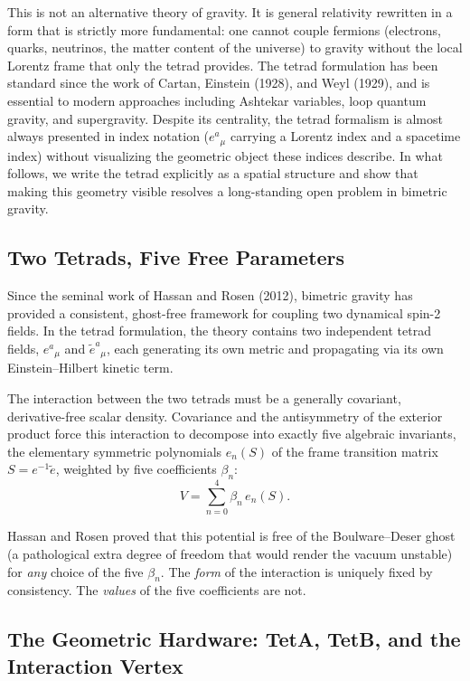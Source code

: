 \documentclass[twocolumn]{iopjournal}
\begin{document}
This is not an alternative theory of gravity. It is general relativity rewritten in a form that is strictly more fundamental: one cannot couple fermions (electrons, quarks, neutrinos, the matter content of the universe) to gravity without the local Lorentz frame that only the tetrad provides. The tetrad formulation has been standard since the work of Cartan, Einstein (1928), and Weyl (1929), and is essential to modern approaches including Ashtekar variables, loop quantum gravity, and supergravity. Despite its centrality, the tetrad formalism is almost always presented in index notation ($e^a{}_\mu$ carrying a Lorentz index and a spacetime index) without visualizing the geometric object these indices describe. In what follows, we write the tetrad explicitly as a spatial structure and show that making this geometry visible resolves a long-standing open problem in bimetric gravity.

\subsection*{Two Tetrads, Five Free Parameters}

Since the seminal work of Hassan and Rosen (2012), bimetric gravity has provided a consistent, ghost-free framework for coupling two dynamical spin-2 fields. In the tetrad formulation, the theory contains two independent tetrad fields, $e^a{}_\mu$ and $\tilde{e}^a{}_\mu$, each generating its own metric and propagating via its own Einstein--Hilbert kinetic term.

The interaction between the two tetrads must be a generally covariant, derivative-free scalar density. Covariance and the antisymmetry of the exterior product force this interaction to decompose into exactly five algebraic invariants, the elementary symmetric polynomials $e_n(S)$ of the frame transition matrix $S = e^{-1}\tilde{e}$, weighted by five coefficients $\beta_n$:
\begin{equation}
V = \sum_{n=0}^{4} \beta_n\, e_n(S).
\end{equation}

Hassan and Rosen proved that this potential is free of the Boulware--Deser ghost (a pathological extra degree of freedom that would render the vacuum unstable) for \emph{any} choice of the five $\beta_n$. The \emph{form} of the interaction is uniquely fixed by consistency. The \emph{values} of the five coefficients are not.

\subsection*{The Geometric Hardware: TetA, TetB, and the Interaction Vertex}
\end{document}
